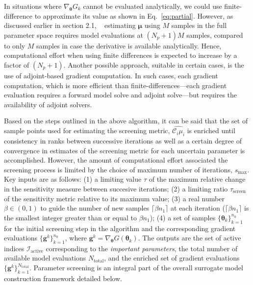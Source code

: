 In situations where $\nabla_{\bm{\theta}}G_k$ cannot be evaluated analytically,
we could use finite-difference to approximate its value as shown in
Eq.~\ref{eq:partial}. However, as discussed earlier in section 2.1,
~
estimating $\bm{\mu}$  using $M$ samples in the full parameter space requires
model evaluations at $(N_p+1)M$ samples, compared to only $M$ samples in case
the derivative is available analytically. Hence, computational effort when
using finite differences is expected to increase by a factor of $(N_p+1)$.
Another possible approach, suitable in certain cases, is the use of
adjoint-based gradient computation. In such cases, each gradient computation,
which is more efficient than finite-differences---each gradient
evaluation requires a forward model solve and adjoint solve---but 
requires the availability of adjoint solvers.

Based on the steps outlined in the above algorithm, it can be said that the set
of sample points used for estimating the screening metric,
$\widehat{\mathcal{C}_i\mu_i}$ is enriched until consistency in ranks between
successive iterations as well as a certain degree of convergence in estimates
of the screening metric for each uncertain parameter is accomplished. However,
the amount of computational effort associated the screening process is limited
by the choice of maximum number of iterations, $s_\text{max}$. 
Key inputs
are as follows: (1) 
a limiting value $\tau$ of the maximum relative change in the sensitivity
measure between succesive iterations; (2) 
a limiting ratio $\tau_\text{screen}$ of the sensitivity metric 
relative to its maximum value;
(3) a real number $\beta \in (0, 1)$ to 
guide the number of new samples $\lceil \beta n_1 \rceil$ 
at each iteration ($\lceil \beta n_1
\rceil$ 
is the smallest integer greater than or equal to $\beta n_1$); 
(4) a set of samples $\{ \bm{\theta}_k \}_{k = 1}^{n_0}$ 
for the initial screening step in
the algorithm and the corresponding gradient evaluations 
$\{ \bm{g}^k \}_{k=1}^{n_0}$, where
$\bm{g}^k = \nabla_{\bm{\theta}} G(\bm{\theta}_k)$. 
The outputs are the set of active
indices $\mathcal{I}_\text{active}$ corresponding to the 
\emph{important parameters}, the total number of available model 
evaluations $N_\text{total}$, and the enriched set of gradient evaluations 
$\{ \bm{g}^k\}_{k=1}^{N_\text{total}}$. 
Parameter screening is an integral part of the
overall surrogate model construction framework 
detailed below.
 
